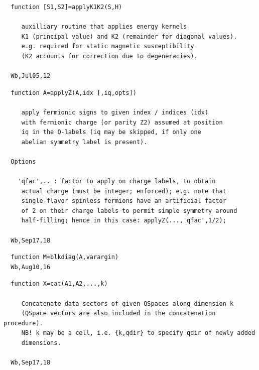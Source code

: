 \documentclass[twoside,12pt]{article}
\begin{document}
\pagebreak[3]



\begin{verbatim}
  function [S1,S2]=applyK1K2(S,H)
 
     auxilliary routine that applies energy kernels
     K1 (principal value) and K2 (remainder for diagonal values).
     e.g. required for static magnetic susceptibility
     (K2 accounts for correction due to degeneracies).
 
  Wb,Jul05,12
\end{verbatim}

\pagebreak[3]



\begin{verbatim}
  function A=applyZ(A,idx [,iq,opts])
 
     apply fermionic signs to given index / indices (idx)
     with fermionic charge (or parity Z2) assumed at position
     iq in the Q-labels (iq may be skipped, if only one
     abelian symmetry label is present).
 
  Options
 
    'qfac',.. : factor to apply on charge labels, to obtain
     actual charge (must be integer; enforced); e.g. note that
     single-flavor spinless fermions have an artificial factor
     of 2 on their charge labels to permit simple symmetry around
     half-filling; hence in this case: applyZ(...,'qfac',1/2);
 
  Wb,Sep17,18
\end{verbatim}

\pagebreak[3]



\begin{verbatim}
  function M=blkdiag(A,varargin)
  Wb,Aug10,16
\end{verbatim}

\pagebreak[3]



\begin{verbatim}
  function X=cat(A1,A2,...,k)
 
     Concatenate data sectors of given QSpaces along dimension k
     (QSpace vectors are also included in the concatenation procedure).
     NB! k may be a cell, i.e. {k,qdir} to specify qdir of newly added
     dimensions.
 
  Wb,Sep17,18
\end{verbatim}
\end{document}
